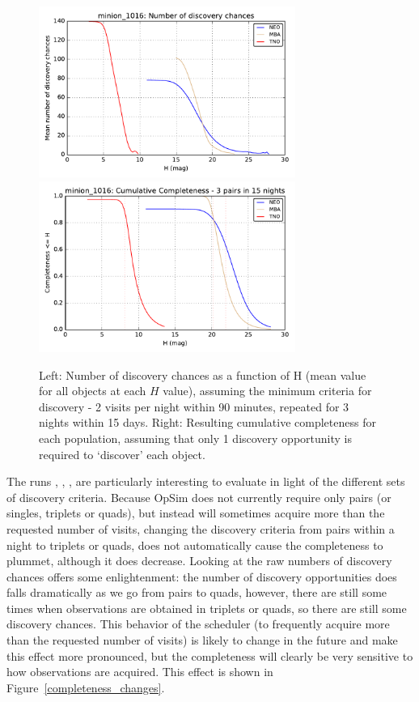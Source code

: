 \begin{figure}
\includegraphics[width=3.3in]{figs/solarsystem/minion_1016_DiscoveryChances_tno_mba_neo_10_year_3_pairs_in_15_nights_MOOB_ComboMetricVsH.pdf}
\includegraphics[width=3.3in]{figs/solarsystem/minion_1016_CumulativeCompleteness_tno_mba_neo_ComboMetricVsH.pdf}
%
\caption{Left: Number of discovery chances as a function of H
  (mean value for all objects at each $H$ value), assuming the minimum criteria for
  discovery - 2 visits per night within 90 minutes, repeated for 3
  nights within 15 days. Right: Resulting cumulative completeness for
  each population, assuming that only 1 discovery opportunity is
  required to `discover' each object.
\label{standard_discovery}}
\end{figure}

The runs , ,
, 
are particularly interesting to evaluate in light of the different
sets of discovery criteria. Because OpSim does not currently require
only pairs (or singles, triplets or quads), but instead will sometimes
acquire more than the requested number of visits, changing the
discovery criteria from pairs within a night to triplets or quads,
does not automatically cause the completeness to plummet, although it
does decrease. Looking at the raw numbers of discovery chances offers some
enlightenment: the number of discovery opportunities does falls dramatically as we go from pairs to quads, however, there
are still some times when observations are obtained in triplets or
quads, so there are still some discovery chances. This behavior of the
scheduler (to frequently acquire more than the requested number of
visits) is likely to change in the future and make this effect more pronounced, but the completeness will
clearly be very sensitive to how observations are acquired. This effect is shown in
Figure~\ref{completeness_changes}.

